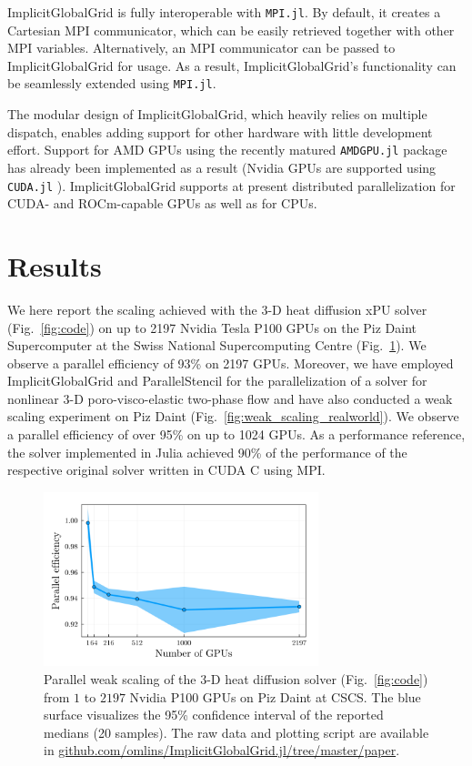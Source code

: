 \documentclass{juliacon}
\begin{document}
ImplicitGlobalGrid is fully interoperable with \texttt{MPI.jl}. By default, it creates a Cartesian MPI communicator, which can be easily retrieved together with other MPI variables. Alternatively, an MPI communicator can be passed to ImplicitGlobalGrid for usage. As a result, ImplicitGlobalGrid's functionality can be seamlessly extended using \texttt{MPI.jl}.

The modular design of ImplicitGlobalGrid, which heavily relies on multiple dispatch, enables adding support for other hardware with little development effort. Support for AMD GPUs using the recently matured \texttt{AMDGPU.jl} package \cite{amdgpu_jl} has already been implemented as a result (Nvidia GPUs are supported using \texttt{CUDA.jl} \cite{besard2018effective}). ImplicitGlobalGrid supports at present distributed parallelization for CUDA- and ROCm-capable GPUs as well as for CPUs.

\section{Results}
We here report the scaling achieved with the 3-D heat diffusion xPU solver (Fig.~\ref{fig:code}) on up to 2197 Nvidia Tesla P100 GPUs on the Piz Daint Supercomputer at the Swiss National Supercomputing Centre (Fig.~\ref{fig:weak_scaling}). We observe a parallel efficiency of 93\% on 2197 GPUs.
Moreover, we have employed ImplicitGlobalGrid and ParallelStencil for the parallelization of a solver for nonlinear 3-D poro-visco-elastic two-phase flow and have also conducted a weak scaling experiment on Piz Daint (Fig.~\ref{fig:weak_scaling_realworld}). We observe a parallel efficiency of over 95\% on up to 1024 GPUs. As a performance reference, the solver implemented in Julia achieved 90\% of the performance of the respective original solver written in CUDA C using MPI.

\begin{figure}[t]
    \centerline{\includegraphics[width=8cm]{julia_gpu_par_eff.png}}
    \caption{Parallel weak scaling of the 3-D heat diffusion solver (Fig.~\ref{fig:code}) from $1$ to $2197$ Nvidia P100 GPUs on Piz Daint at CSCS. The blue surface visualizes the 95\% confidence interval of the reported medians (20 samples). The raw data and plotting script are available in \url{github.com/omlins/ImplicitGlobalGrid.jl/tree/master/paper}.}
	\label{fig:weak_scaling}
\end{figure}
\end{document}
